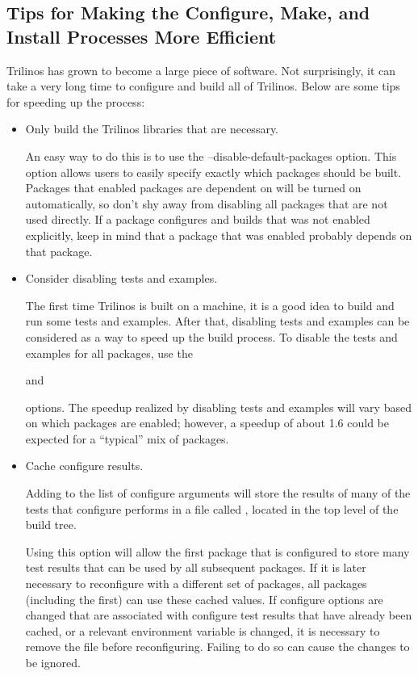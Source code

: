\subsection{Tips for Making the Configure, Make, and Install Processes More Efficient}

Trilinos has grown to become a large piece of software.  Not surprisingly,
it can take a very long time to configure and build all of Trilinos.  Below 
are some tips for speeding up the process:

\begin{itemize}
\item Only build the Trilinos libraries that are necessary.

An easy way to do this is to use the --disable-default-packages option.  
This option allows users to easily specify exactly which packages should be 
built.  Packages that enabled 
packages are dependent on will be turned on automatically, so
don't shy away from disabling all packages that are not used directly.  
If a package configures and builds that was not enabled explicitly, 
keep in mind that a package that was enabled probably depends on that package.

\item Consider disabling tests and examples.

The first time Trilinos is built on a machine, it is a good idea to build 
and run some tests and examples.  After that, disabling tests and examples
can be considered as a way to speed up the build process.  To disable 
the tests and examples for all packages, use the 

and


options.  The speedup realized by disabling tests and examples will vary based 
on which packages are enabled; however, a speedup of about 1.6 could be 
expected for a ``typical'' mix of packages.

\item Cache configure results.

Adding 
to the list of configure arguments will store the results of many of the tests
that configure performs in a file called , 
located in the top level of the build tree.

Using this option will allow the first package that is configured to store 
many test results that can be used by all subsequent packages.  If it is 
later necessary to reconfigure with a different set of packages, all packages
(including the first) can use these cached values.  If configure options are
changed that are associated with configure test results that have already 
been cached, or a relevant environment variable is changed, it is necessary 
to remove the
 file before reconfiguring.  Failing to do so
can cause the changes to be ignored.  


\end{itemize}
